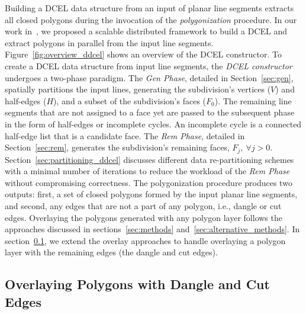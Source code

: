 Building a DCEL data structure from an input of planar line segments extracts all closed polygons during the invocation of the \textit{polygonization} procedure. 
In our work in~\cite{LailaMDMPaper}, we proposed a scalable distributed framework to build a DCEL and extract polygons in parallel from the input line segments.
Figure~\ref{fig:overview_ddcel} shows an overview of the DCEL constructor. 
To create a DCEL data structure from input line segments, the \textit{DCEL constructor} undergoes a two-phase paradigm. 
The \textit{Gen Phase}, detailed in Section~\ref{sec:gen}, spatially partitions the input lines, generating the subdivision's vertices ($V$) and half-edges ($H$), and a subset of the subdivision's faces ($F_0$). 
The remaining line segments that are not assigned to a face yet are passed to the subsequent phase in the form of half-edges or incomplete cycles. 
An incomplete cycle is a connected half-edge list that is a candidate face.
The \textit{Rem Phase}, detailed in Section~\ref{sec:rem}, generates the subdivision's remaining faces, $F_j, \ \forall j > 0$. 
Section~\ref{sec:partitioning_ddcel} discusses different data re-partitioning schemes with a minimal number of iterations to reduce the workload of the \textit{Rem Phase} without compromising correctness. 
The polygonization procedure produces two outputs: first, a set of closed polygons formed by the input planar line segments, and second, any edges that are not a part of any polygon, i.e., dangle or cut edges. Overlaying the polygons generated with any polygon layer follows the approaches discussed in sections~\ref{sec:methods} and~\ref{sec:alternative_methods}. In section~\ref{sec:over_dang}, we extend the overlay approaches to handle overlaying a polygon layer with the remaining edges (the dangle and cut edges).








\subsection{Overlaying Polygons with Dangle and Cut Edges} \label{sec:over_dang}

